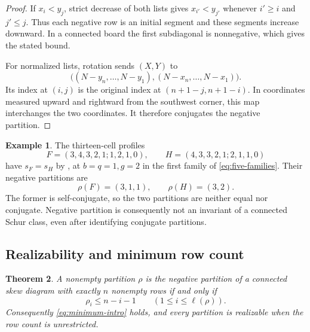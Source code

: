 \documentclass[11pt,a4paper]{amsart}
\numberwithin{equation}{section}
\theoremstyle{plain}
\newtheorem{theorem}{Theorem}[section]
\theoremstyle{definition}
\newtheorem{example}[theorem]{Example}
\begin{document}
\begin{proof}
If \(x_i<y_j\), strict decrease of both lists gives
\(x_{i'}<y_{j'}\) whenever \(i'\ge i\) and \(j'\le j\).
Thus each negative row is an initial segment and these segments increase
downward.  In a connected board the first subdiagonal is nonnegative,
which gives the stated bound.

For normalized lists, rotation sends \((X,Y)\) to
\[
 \bigl((N-y_n,\ldots,N-y_1),(N-x_n,\ldots,N-x_1)\bigr).
\]
Its index at \((i,j)\) is the original index at
\((n+1-j,n+1-i)\).  In coordinates measured upward and rightward from
the southwest corner, this map interchanges the two coordinates.
It therefore conjugates the negative partition.
\end{proof}

\begin{example}\label{ex:negative-shape-change}
The thirteen-cell profiles
\[
 F=(3,4,3,2,1;1,2,1,0),\qquad
 H=(4,3,3,2,1;2,1,1,0)
\]
have \(s_F=s_H\) by , at \(b=q=1,g=2\)
in the first family of \eqref{eq:five-families}.  Their negative
partitions are
\[
 \rho(F)=(3,1,1),\qquad \rho(H)=(3,2).
\]
The former is self-conjugate, so the two partitions are neither equal nor
conjugate.  Negative partition is consequently not an invariant of a
connected Schur class, even after identifying conjugate partitions.
\end{example}

\subsection{Realizability and minimum row count}\label{sec:negative-invariants}

\begin{theorem}\label{thm:negative-realizability}
A nonempty partition \(\rho\) is the negative partition of a connected skew diagram with exactly \(n\) nonempty rows if and only if
\begin{equation}\label{eq:realizability}
 \rho_i\le n-i-1\qquad(1\le i\le\ell(\rho)).
\end{equation}
Consequently \eqref{eq:minimum-intro} holds, and every partition is realizable when the row count is unrestricted.
\end{theorem}
\end{document}
